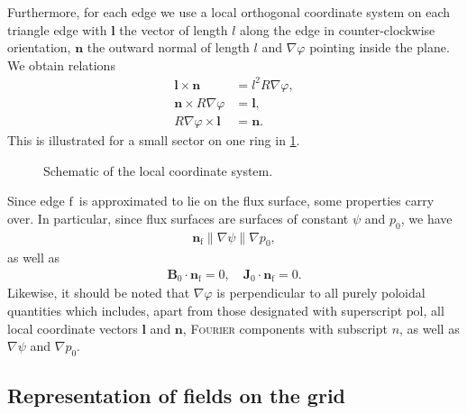 \documentclass[a4paper, twoside, 10pt, english]{article}
\numberwithin{equation}{section}
\let\temp\varrho
\let\varrho\rho
\let\rho\temp
\let\temp\vartheta
\let\vartheta\theta
\let\theta\temp
\let\temp\varphi
\let\varphi\phi
\let\phi\temp
\let\vec\symbf
\newcommand*\grad{\ensuremath{\nabla}}
\newcommand*\pol{\ensuremath{\textrm{pol}}}  %
\newcommand*\fs{\ensuremath{\textrm{f}}}  %
\begin{document}
Furthermore, for each edge we use a local orthogonal coordinate system on each triangle edge with $\vec{l}$ the vector of length $l$ along the edge in counter-clockwise orientation, $\vec{n}$ the outward normal of length $l$ and $\grad \phi$ pointing inside the plane. We obtain relations
\begin{align}
  \vec{l} \times \vec{n} &= l^{2} R \grad \phi, \label{eq:edge_phi} \\
  \vec{n} \times R \grad \phi &= \vec{l}, \label{eq:edge_l} \\
  R \grad \phi \times \vec{l} &= \vec{n}. \label{eq:edge_n}
\end{align}
This is illustrated for a small sector on one ring in \cref{fig:local_coordinates}.
\begin{figure}[bth]
  \centering
  
  \caption{Schematic of the local coordinate system.}
  \label{fig:local_coordinates}
\end{figure}

Since edge \fs\ is approximated to lie on the flux surface, some properties carry over. In particular, since flux surfaces are surfaces of constant $\psi$ and $p_{0}$, we have
\begin{gather}
  \vec{n}_{\fs} \parallel \grad \psi \parallel \grad p_{0},
\end{gather}
as well as
\begin{gather}
  \vec{B}_{0} \cdot \vec{n}_{\fs} = 0, \quad \vec{J}_{0} \cdot \vec{n}_{\fs} = 0.
\end{gather}
Likewise, it should be noted that $\nabla \phi$ is perpendicular to all purely poloidal quantities which includes, apart from those designated with superscript \pol, all local coordinate vectors $\vec{l}$ and $\vec{n}$, \textsc{Fourier} components with subscript $n$, as well as $\grad \psi$ and $\grad p_{0}$.

\subsection{Representation of fields on the grid}
\label{sec:dofs}
\end{document}
